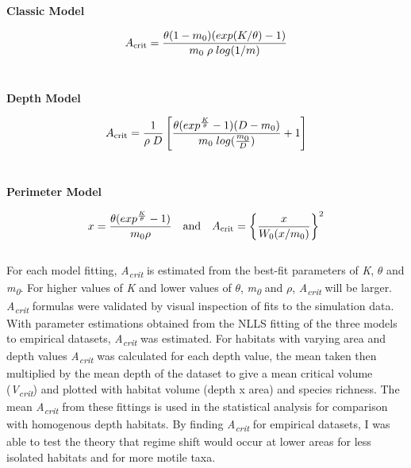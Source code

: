{\begin{center}
\textbf{Classic Model}
\end{center}

\begin{equation}
A\textsubscript{crit}=\frac{\theta(1-m\textsubscript{0})(exp(K/\theta)-1)}{m\textsubscript{0}\;\rho\;log(1/m)} 
\end{equation}\\

\begin{center}
\textbf{Depth Model}
\end{center}

\begin{equation}
A\textsubscript{crit}=\frac{1}{\rho\; D}\left[\frac{{\theta}(exp^\frac{K}{\theta}-1)(D - m\textsubscript{0})}{m\textsubscript{0}\;log(\frac{m\textsubscript{0}}{D})}+1\right]
\end{equation}\\

\begin{center}
\textbf{Perimeter Model}
\end{center}

\begin{equation}
x = \frac{\theta(exp^\frac{K}{\theta}-1)}{m\textsubscript{0}{\rho}}
 \quad\mathrm{and}\quad
A\textsubscript{crit}=\left\{\frac{x}{W_{0}(x/m\textsubscript{0})}\right\}^2
\end{equation}\\

\noindent For each model fitting, \textit{A\textsubscript{crit}} is estimated from the best-fit parameters of \textit{K}, $\theta$ and \textit{m\textsubscript{0}}. For higher values of \textit{K} and lower values of $\theta$, \textit{m\textsubscript{0}} and $\rho$, \textit{A\textsubscript{crit}} will be larger.  \textit{A\textsubscript{crit}} formulas were validated by visual inspection of fits to the simulation data. \\

\noindent With parameter estimations obtained from the NLLS fitting of the three models to empirical datasets, \textit{A\textsubscript{crit}} was estimated. For habitats with varying area and depth values \textit{A\textsubscript{crit}} was calculated for each depth value, the mean taken then multiplied by the mean depth of the dataset to give a mean critical volume (\textit{V\textsubscript{crit}}) and plotted with habitat volume (depth x area) and species richness. The mean \textit{A\textsubscript{crit}} from these fittings is used in the statistical analysis for comparison with homogenous depth habitats. By finding \textit{A\textsubscript{crit}} for empirical datasets, I was able to test the theory that regime shift would occur at lower areas for less isolated habitats and for more motile taxa.


}
